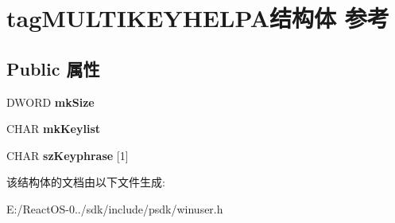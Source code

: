 \hypertarget{structtag_m_u_l_t_i_k_e_y_h_e_l_p_a}{}\section{tag\+M\+U\+L\+T\+I\+K\+E\+Y\+H\+E\+L\+P\+A结构体 参考}
\label{structtag_m_u_l_t_i_k_e_y_h_e_l_p_a}
\subsection*{Public 属性}
\begin{DoxyCompactItemize}
\item 
\mbox{\label{structtag_m_u_l_t_i_k_e_y_h_e_l_p_a_ae9f433c8db218e4df256dc1751c23aed}} 
D\+W\+O\+RD {\bfseries mk\+Size}
\item 
\mbox{\label{structtag_m_u_l_t_i_k_e_y_h_e_l_p_a_a566f7a41f26f0254437d9314eca54c28}} 
C\+H\+AR {\bfseries mk\+Keylist}
\item 
\mbox{\label{structtag_m_u_l_t_i_k_e_y_h_e_l_p_a_a042c2911ef9a612c6956b5d8f0a1983b}} 
C\+H\+AR {\bfseries sz\+Keyphrase} \mbox{[}1\mbox{]}
\end{DoxyCompactItemize}


该结构体的文档由以下文件生成\+:\begin{DoxyCompactItemize}
\item 
E\+:/\+React\+O\+S-\/0../sdk/include/psdk/winuser.\+h\end{DoxyCompactItemize}
